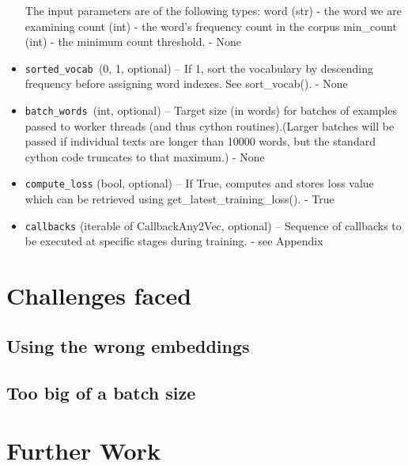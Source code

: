 \begin{itemize}
    The input parameters are of the following types:
            word (str) - the word we are examining
            count (int) - the word’s frequency count in the corpus
            min\_count (int) - the minimum count threshold. - None

  \item  \texttt{sorted\_vocab }({0, 1}, optional) – If 1, sort the vocabulary by descending frequency before assigning word indexes. See sort\_vocab(). - None
 \item   \texttt{batch\_words }(int, optional) – Target size (in words) for batches of examples passed to worker threads (and thus cython routines).(Larger batches will be passed if individual texts are longer than 10000 words, but the standard cython code truncates to that maximum.) - None 
  \item  \texttt{compute\_loss} (bool, optional) – If True, computes and stores loss value which can be retrieved using get\_latest\_training\_loss(). - True
 \item   \texttt{callbacks} (iterable of CallbackAny2Vec, optional) – Sequence of callbacks to be executed at specific stages during training. - see Appendix

\end{itemize}

\section{Challenges faced}
\subsection{Using the wrong embeddings}
\subsection{Too big of a batch size}
\section{Further Work}